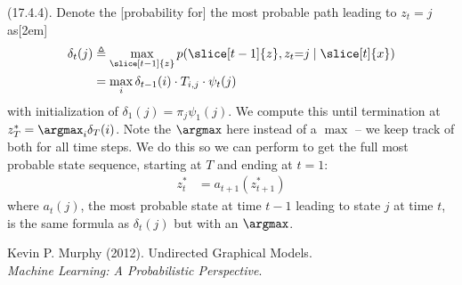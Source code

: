 \documentclass[11pt]{article}
\newcommand\myspace[1][]{\vspace{#1\bigskipamount}}
\newcommand\p{\Needspace{10\baselineskip} \noindent}
\begin{document}
\myspace
\p {} (17.4.4). Denote the [probability for] the most probable path leading to $z_t{=}j$ as[2em]
\begin{align}
	\delta_t(j) 
		&\triangleq \max_{\slice[t-1]{z}} p(\slice[t-1]{z}, z_t{=}j \mid \slice[t]{x}) \\
		&= \max_i \delta_{t-1}(i) \cdot T_{i,j} \cdot  \psi_t(j)
\end{align}
with initialization of $\delta_1(j) = \pi_j \psi_1(j)$. We compute this until termination at $z_{T}^* = \argmax_i \delta_T(i)$. Note the $\argmax$ here instead of a $\max$ -- we keep track of both for all time steps. We do this so we can perform  to get the full most probable state sequence, starting at $T$ and ending at $t=1$:
\begin{align}
	z_t^* &= a_{t+1}(z_{t+1}^*)
\end{align}
where $a_t(j)$, the most probable state at time $t-1$ leading to state $j$ at time $t$, is the same formula as $\delta_t(j)$ but with an $\argmax$. 































\vspace{-1.7em}
{\scriptsize Kevin P. Murphy (2012). Undirected Graphical Models.\\ \textit{Machine Learning: A Probabilistic Perspective}.\\ }
\end{document}
